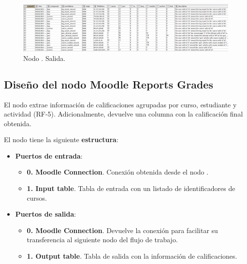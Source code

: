 \begin{figure}[!h]
	\centering
	\includegraphics[width=1\textwidth]{img/nodes_moodle_reports_logs_output.png}
	\caption{Nodo . Salida.}
	\label{fig:moodlereportslogs_output}
\end{figure}
\FloatBarrier
\hphantom{ }




\newpage
\subsection{Diseño del nodo Moodle Reports Grades}

El nodo  extrae información de calificaciones agrupadas por curso, estudiante y actividad (RF-5). Adicionalmente, devuelve una columna con la calificación final obtenida. 
\

El nodo tiene la siguiente \textbf{estructura}:

\begin{itemize}
	\item \textbf{Puertos de entrada}: 
    \begin{itemize}
		\item \textbf{0. Moodle Connection}. Conexión obtenida desde el nodo . 
		\item \textbf{1. Input table}. Tabla de entrada con un listado de identificadores de cursos. 
   	\end{itemize}

	\item \textbf{Puertos de salida}: 
    \begin{itemize}
		\item \textbf{0. Moodle Connection}. Devuelve la conexión para facilitar su transferencia al siguiente nodo del flujo de trabajo. 
		\item \textbf{1. Output table}. Tabla de salida con la información de calificaciones. 
   	\end{itemize}

\end{itemize}

